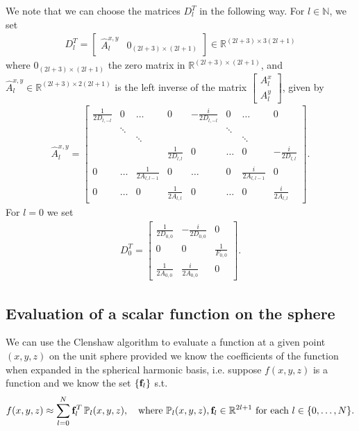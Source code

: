 \documentclass[11pt, oneside]{article}   	%
\newcommand{\R}{\mathbb{R}}
\newcommand{\N}{\mathbb{N}}
\newcommand{\Pl}{\mathbb{P}_l}
\newcommand{\Dlt}{D^T_l}
\begin{document}
We note that we can choose the matrices \(\Dlt\) in the following way. For \(l \in \N\), we set
\begin{align}
\Dlt = \begin{bmatrix}
		\hat{A}^{x,y}_l & 0_{(2l+3)\times(2l+1)}
	  \end{bmatrix} \in \R^{(2l+3)\times3(2l+1)}
\end{align}
where \(0_{(2l+3)\times(2l+1)}\) the zero matrix in \(\R^{(2l+3)\times(2l+1)}\), and \(\hat{A}^{x,y}_l \in \R^{(2l+3)\times2(2l+1)}\) is the left inverse of the matrix \(\begin{bmatrix} A^x_l \\ A^y_l \end{bmatrix}\), given by
\begin{align}
\hat{A}^{x,y}_l = \begin{bmatrix}
		\frac{1}{2D_{l,-l}} & 0 & \hdots & 0 & -\frac{i}{2D_{l,-l}} & 0 & \hdots & 0 \\
		& \ddots & & & & \ddots & & \\
		& & \ddots & & & & \ddots & \\
		& & & \frac{1}{2D_{l,l}} & 0 & \hdots & 0 & -\frac{i}{2D_{l,l}} \\
		0 & \hdots & \frac{1}{2A_{l,l-1}} & 0 & \hdots & 0 & \frac{i}{2A_{l,l-1}} & 0 \\
		0 & \hdots & 0 & \frac{1}{2A_{l,l}} & 0 & \hdots & 0 & \frac{i}{2A_{l,l}}
	  \end{bmatrix}.
\end{align}
For \(l = 0\) we set
\begin{align}
D^T_0 = \begin{bmatrix}
		\frac{1}{2D_{0,0}}&  -\frac{i}{2D_{0,0}} & 0 \\
		0 & 0 & \frac{1}{F_{0,0}} \\
		\frac{1}{2A_{0,0}}&  \frac{i}{2A_{0,0}} & 0 
	     \end{bmatrix}.
\end{align}




\subsection{Evaluation of a scalar function on the sphere}
We can use the Clenshaw algorithm to evaluate a function at a given point \((x,y,z)\) on the unit sphere provided we know the coefficients of the function when expanded in the spherical harmonic basis, i.e. suppose \(f(x,y,z)\) is a function and we know the set \(\{\bold{f}_l\}\) s.t.
\begin{align}
f(x,y,z) \approx \sum^N_{l=0} \bold{f}_l^T \, \Pl (x,y,z), \quad \text{where } \Pl (x,y,z), \bold{f}_l \in \R^{2l+1} \text{ for each } l \in \{0,\dots,N\}.
\end{align}
\end{document}
